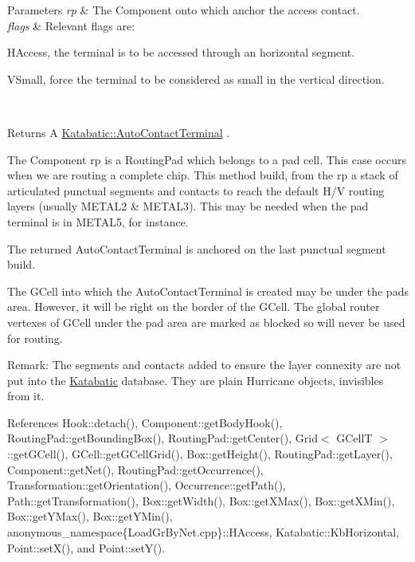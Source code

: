 \begin{DoxyParams}{Parameters}
{\em rp} & The Component onto which anchor the access contact. \\
\hline
{\em flags} & Relevant flags are\+:
\begin{DoxyItemize}
\item H\+Access, the terminal is to be accessed through an horizontal segment.
\item V\+Small, force the terminal to be considered as small in the vertical direction. 
\end{DoxyItemize}\\
\hline
\end{DoxyParams}
\begin{DoxyReturn}{Returns}
A \hyperlink{classKatabatic_1_1AutoContactTerminal}{Katabatic\+::\+Auto\+Contact\+Terminal} .
\end{DoxyReturn}
The Component {\ttfamily rp} is a Routing\+Pad which belongs to a pad cell. This case occurs when we are routing a complete chip. This method build, from the {\ttfamily rp} a stack of articulated punctual segments and contacts to reach the default H/V routing layers (usually {\ttfamily M\+E\+T\+A\+L2} \& {\ttfamily M\+E\+T\+A\+L3}). This may be needed when the pad terminal is in {\ttfamily M\+E\+T\+A\+L5}, for instance.

The returned Auto\+Contact\+Terminal is anchored on the last punctual segment build.

The G\+Cell into which the Auto\+Contact\+Terminal is created may be under the pads area. However, it will be right on the border of the G\+Cell. The global router vertexes of G\+Cell under the pad area are marked as blocked so will never be used for routing.

\begin{DoxyParagraph}{Remark\+:}
The segments and contacts added to ensure the layer connexity are not put into the \hyperlink{namespaceKatabatic}{Katabatic} database. They are plain Hurricane objects, invisibles from it. 
\end{DoxyParagraph}


References Hook\+::detach(), Component\+::get\+Body\+Hook(), Routing\+Pad\+::get\+Bounding\+Box(), Routing\+Pad\+::get\+Center(), Grid$<$ G\+Cell\+T $>$\+::get\+G\+Cell(), G\+Cell\+::get\+G\+Cell\+Grid(), Box\+::get\+Height(), Routing\+Pad\+::get\+Layer(), Component\+::get\+Net(), Routing\+Pad\+::get\+Occurrence(), Transformation\+::get\+Orientation(), Occurrence\+::get\+Path(), Path\+::get\+Transformation(), Box\+::get\+Width(), Box\+::get\+X\+Max(), Box\+::get\+X\+Min(), Box\+::get\+Y\+Max(), Box\+::get\+Y\+Min(), anonymous\+\_\+namespace\{\+Load\+Gr\+By\+Net.\+cpp\}\+::\+H\+Access, Katabatic\+::\+Kb\+Horizontal, Point\+::set\+X(), and Point\+::set\+Y().


